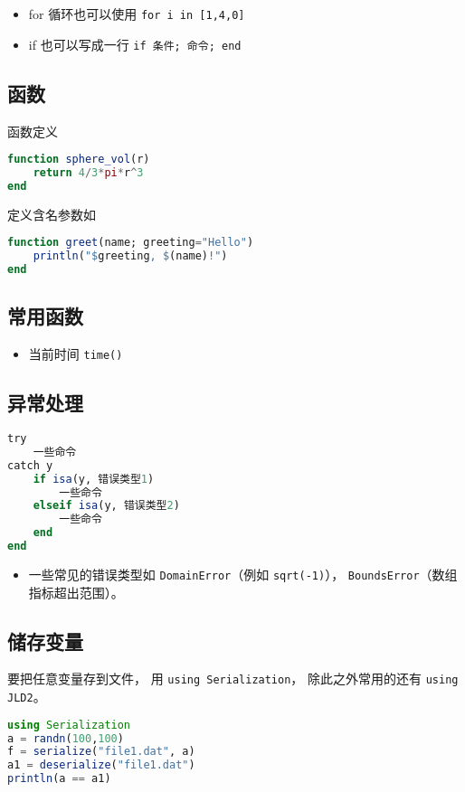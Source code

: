 \begin{itemize}
\item for 循环也可以使用 \verb|for i in [1,4,0]|
\item if 也可以写成一行 \verb|if 条件; 命令; end|
\end{itemize}

\subsection{函数}
函数定义
\begin{lstlisting}[language=julia]
function sphere_vol(r)
    return 4/3*pi*r^3
end
\end{lstlisting}

定义含名参数如
\begin{lstlisting}[language=julia]
function greet(name; greeting="Hello")
    println("$greeting, $(name)!")
end
\end{lstlisting}

\subsection{常用函数}
\begin{itemize}
\item 当前时间 \verb|time()|
\end{itemize}

\subsection{异常处理}
\begin{lstlisting}[language=julia]
try 
    一些命令
catch y
    if isa(y, 错误类型1)
        一些命令
    elseif isa(y, 错误类型2)
        一些命令
    end
end
\end{lstlisting}
\begin{itemize}
\item 一些常见的错误类型如 \verb|DomainError|（例如 \verb|sqrt(-1)|）， \verb|BoundsError|（数组指标超出范围）。
\end{itemize}


\subsection{储存变量}
要把任意变量存到文件， 用 \verb|using Serialization|， 除此之外常用的还有 \verb|using JLD2|。
\begin{lstlisting}[language=julia]
using Serialization
a = randn(100,100)
f = serialize("file1.dat", a)
a1 = deserialize("file1.dat")
println(a == a1)
\end{lstlisting}

